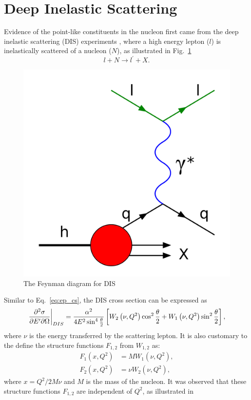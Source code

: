 \section {Deep Inelastic Scattering}
\label{sec:dis}
Evidence of the point-like constituents in the nucleon first came from the deep
inelastic scattering (DIS) experiments \cite{breidenbach1969}, where a high 
energy lepton ($l$) is inelastically scattered of a nucleon ($N$), as 
illustrated in Fig.\ \ref{fig:DIS}
\begin{equation}
	l + N \rightarrow l^\prime + X.
\end{equation}
\begin{figure}[htbp!]
    \centering
    \includegraphics[width=0.5\linewidth]{./images/DIS}
    \caption{The Feynman diagram for DIS}
    \label{fig:DIS}
\end{figure}
Similar to Eq.\ \ref{eq:ep_cs}, the DIS cross section can be expressed as 
\begin{equation}
	\eval{\pdv{\sigma}{E^\prime}{\Omega}}_{DIS} = \frac{\alpha^2}{4E^2 \sin^4 
	\frac{\theta}{2}} \left[ W_2\left(\nu,Q^2\right)\cos^2
	\frac{\theta}{2} + W_1\left(\nu,Q^2\right)\sin^2 \frac{\theta}{2}
	\right],
	\label{eq:DIS_cs1}
\end{equation}
where $\nu$ is the energy transferred by the scattering lepton. It is also 
customary to the define the structure functions $F_{1,2}$ from $W_{1,2}$ as:
\begin{equation}
	\begin{split}
		F_1\left(x,Q^2\right) &= MW_1\left(\nu,Q^2\right),\\
		F_2\left(x,Q^2\right) &= \nu W_2\left(\nu,Q^2\right),
	\end{split}
\end{equation}
where $x=Q^2/2M\nu$ and $M$ is the mass of the nucleon. It was observed that 
these structure functions $F_{1,2}$ are independent of $Q^2$, as illustrated in
